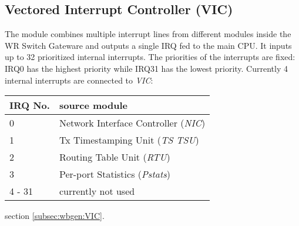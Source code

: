 \subsection{Vectored Interrupt Controller (VIC)}
\label{sec:vic}


The module combines multiple interrupt lines from different modules inside the
WR Switch Gateware and outputs a single IRQ fed to the main CPU. It inputs up to 32
prioritized internal interrupts. The priorities of the interrupts are fixed: IRQ0 has
the highest priority while IRQ31 has the lowest priority. Currently 4 internal
interrupts are connected to \emph{VIC}:
\begin{center}
\begin{tabular}{|l|l|}
  \hline
  IRQ No. & source module\\
  \hline \hline
  0 & Network Interface Controller (\emph{NIC})\\
  1 & Tx Timestamping Unit (\emph{TS TSU})\\
  2 & Routing Table Unit (\emph{RTU})\\
  3 & Per-port Statistics (\emph{Pstats})\\
  4 - 31 & currently not used\\
  \hline
\end{tabular}
\end{center}

\vspace{12pt}
 section \ref{subsec:wbgen:VIC}.
